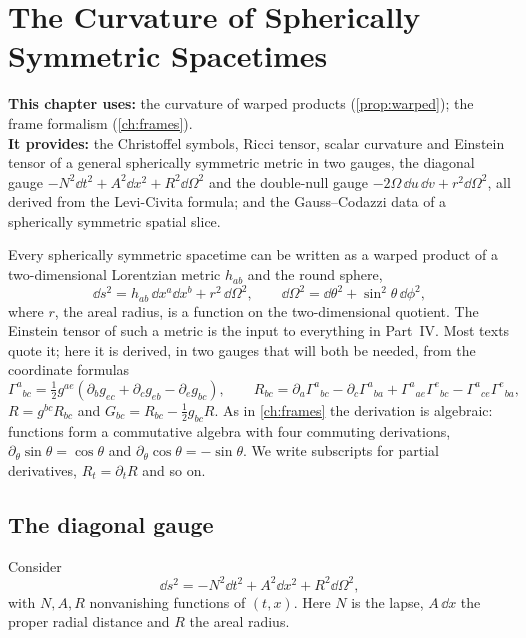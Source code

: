 \chapter{The Curvature of Spherically Symmetric Spacetimes}
\label{ch:sphmetrics}

\begin{usesbox}
\textbf{This chapter uses:} the curvature of warped products (\cref{prop:warped}); the frame formalism (\cref{ch:frames}).\\
\textbf{It provides:} the Christoffel symbols, Ricci tensor, scalar curvature and Einstein tensor of a general spherically symmetric metric in two gauges, the diagonal gauge $-N^2\dd t^2+A^2\dd x^2+R^2\dd\Omega^2$ and the double-null gauge $-2\Omega\,\dd u\,\dd v+r^2\dd\Omega^2$, all derived from the Levi-Civita formula; and the Gauss--Codazzi data of a spherically symmetric spatial slice.
\end{usesbox}

Every spherically symmetric spacetime can be written as a warped product of a two-dimensional Lorentzian metric $h_{ab}$ and the round sphere,
\[
\dd s^2=h_{ab}\,\dd x^a\dd x^b+r^2\,\dd\Omega^2,\qquad \dd\Omega^2=\dd\theta^2+\sin^2\theta\,\dd\phi^2,
\]
where $r$, the areal radius, is a function on the two-dimensional quotient. The Einstein tensor of such a metric is the input to everything in Part~IV. Most texts quote it; here it is derived, in two gauges that will both be needed, from the coordinate formulas
\[
\Gamma^a{}_{bc}=\tfrac12g^{ae}(\partial_bg_{ec}+\partial_cg_{eb}-\partial_eg_{bc}),\qquad
R_{bc}=\partial_a\Gamma^a{}_{bc}-\partial_c\Gamma^a{}_{ba}+\Gamma^a{}_{ae}\Gamma^e{}_{bc}-\Gamma^a{}_{ce}\Gamma^e{}_{ba},
\]
$R=g^{bc}R_{bc}$ and $G_{bc}=R_{bc}-\frac12g_{bc}R$. As in \cref{ch:frames} the derivation is algebraic: functions form a commutative algebra with four commuting derivations, $\partial_\theta\sin\theta=\cos\theta$ and $\partial_\theta\cos\theta=-\sin\theta$. We write subscripts for partial derivatives, $R_t=\partial_tR$ and so on.

\section{The diagonal gauge}

Consider
\begin{equation}\label{eq:diagmetric}
\dd s^2=-N^2\dd t^2+A^2\dd x^2+R^2\dd\Omega^2,
\end{equation}
with $N,A,R$ nonvanishing functions of $(t,x)$. Here $N$ is the lapse, $A\,\dd x$ the proper radial distance and $R$ the areal radius.

